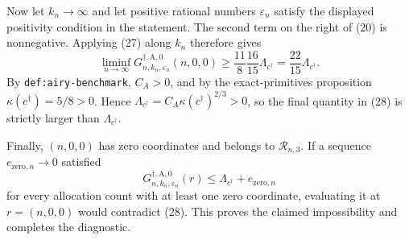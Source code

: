 Now let \(k_n\to\infty\) and let positive rational numbers \(\varepsilon_n\) satisfy the displayed positivity condition in the statement.  The second term on the right of (20) is nonnegative.  Applying (27) along \(k_n\) therefore gives
\[
\liminf_{n\to\infty}
G_{n,k_n,\varepsilon_n}^{\dagger,\mathrm A,0}(n,0,0)
\geq\frac{11}{8}\frac{16}{15}\Lambda_{c^\dagger}
=\frac{22}{15}\Lambda_{c^\dagger}.
\tag{28}
\]
By \texttt{def:airy-benchmark}, \(C_A>0\), and by the exact-primitives proposition \(\kappa(c^\dagger)=5/8>0\).  Hence
\(\Lambda_{c^\dagger}=C_A\kappa(c^\dagger)^{2/3}>0\), so the final quantity in (28) is strictly larger than \(\Lambda_{c^\dagger}\).

Finally, \((n,0,0)\) has zero coordinates and belongs to \(\mathcal R_{n,3}\).  If a sequence \(e_{\mathrm{zero},n}\to0\) satisfied
\[
G_{n,k_n,\varepsilon_n}^{\dagger,\mathrm A,0}(r)
\leq\Lambda_{c^\dagger}+e_{\mathrm{zero},n}
\]
for every allocation count with at least one zero coordinate, evaluating it at \(r=(n,0,0)\) would contradict (28).  This proves the claimed impossibility and completes the diagnostic.
